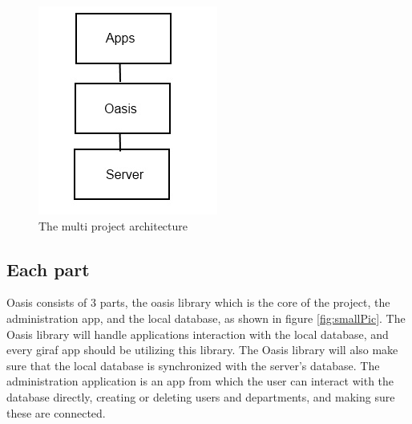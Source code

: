 \begin{figure}
	\centering
		\includegraphics[width=\textwidth]{images/BigPicture.jpg}
	\caption{The multi project architecture}
	\label{fig:bigpic}
\end{figure}

\subsection{Each part}
Oasis consists of 3 parts, the oasis library which is the core of the project, the administration app, and the local database, as shown in figure \vref{fig:smallPic}. The Oasis library will handle applications interaction with the local database, and every giraf app should be utilizing this library. The Oasis library will also make sure that the local database is synchronized with the server's database.
The administration application is an app from which the user can interact with the database directly, creating or deleting users and departments, and making sure these are connected.


